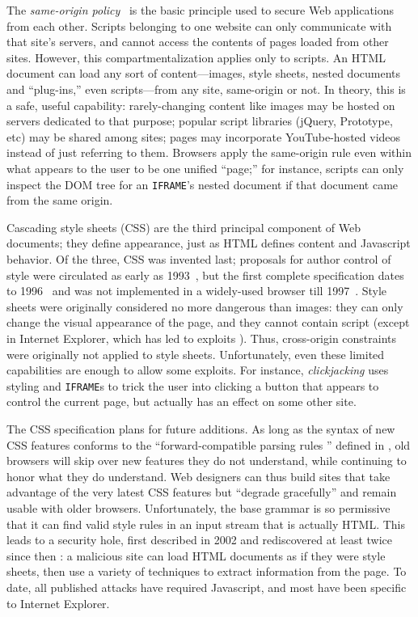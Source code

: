 \documentclass{acm_proc_article-sp}
\begin{document}
The \emph{same-origin policy}~\cite{mozillasameorigin} is the basic
principle used to secure Web applications from each other.  Scripts
belonging to one website can only communicate with that site's
servers, and cannot access the contents of pages loaded from other
sites.  However, this compartmentalization applies only to scripts.
An HTML document can load any sort of content---images, style sheets,
nested documents and “plug-ins,” even scripts---from any site,
same-origin or not.  In theory, this is a safe, useful capability:
rarely-changing content like images may be hosted on servers dedicated
to that purpose; popular script libraries (jQuery, Prototype, etc) may
be shared among sites; pages may incorporate YouTube-hosted videos
instead of just referring to them.  Browsers apply the same-origin
rule even within what appears to the user to be one unified “page;”
for instance, scripts can only inspect the DOM tree for an
\texttt{IFRAME}'s nested document if that document came from the same
origin.

Cascading style sheets (CSS) are the third principal component of Web
documents; they define appearance, just as HTML defines content and
Javascript behavior.  Of the three, CSS was invented last; proposals
for author control of style were circulated as early as
1993~\cite{css-history}, but the first complete specification dates to
1996~\cite{css1} and was not implemented in a widely-used browser till
1997~\cite{eich}.  Style sheets were originally considered no more
dangerous than images: they can only change the visual appearance of
the page, and they cannot contain script (except in Internet Explorer,
which has led to exploits \cite{joyexploit}).  Thus, cross-origin
constraints were originally not applied to style sheets.
Unfortunately, even these limited capabilities are enough to allow
some exploits.  For instance, \emph{clickjacking}
\cite{clickjacking} uses styling and \texttt{IFRAME}s to trick
the user into clicking a button that appears to control the current
page, but actually has an effect on some other site.

The CSS specification plans for future additions.  As long as the
syntax of new CSS features conforms to the “forward-compatible parsing
rules ” defined in \cite{syndata}, old browsers will skip over new
features they do not understand, while continuing to honor what they
do understand.  Web designers can thus build sites that take advantage
of the very latest CSS features but “degrade gracefully” and remain
usable with older browsers.  Unfortunately, the base grammar is so
permissive that it can find valid style rules in an input stream that
is actually HTML.  This leads to a security hole, first described in
2002 \cite{cssxss02} and rediscovered at least twice since then
\cite{cssxss05,cssxss08}: a malicious site can load HTML documents as
if they were style sheets, then use a variety of techniques to extract
information from the page.  To date, all published attacks have
required Javascript, and most have been specific to Internet Explorer.
\end{document}
